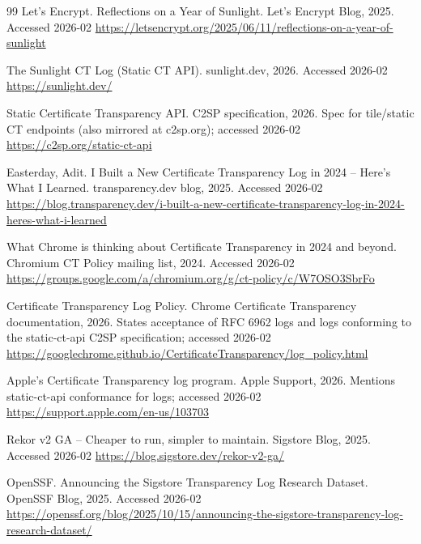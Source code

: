 \documentclass[11pt]{article}
\begin{document}
\begin{thebibliography}{99}
{Let's Encrypt}.
\newblock Reflections on a Year of Sunlight.
\newblock Let's Encrypt Blog, 2025.
\newblock Accessed 2026-02
\newblock \url{https://letsencrypt.org/2025/06/11/reflections-on-a-year-of-sunlight}

\newblock The Sunlight CT Log (Static CT API).
\newblock sunlight.dev, 2026.
\newblock Accessed 2026-02
\newblock \url{https://sunlight.dev/}

\newblock Static Certificate Transparency API.
\newblock C2SP specification, 2026.
\newblock Spec for tile/static CT endpoints (also mirrored at c2sp.org); accessed 2026-02
\newblock \url{https://c2sp.org/static-ct-api}

Easterday, Adit.
\newblock I Built a New Certificate Transparency Log in 2024 -- Here's What I Learned.
\newblock transparency.dev blog, 2025.
\newblock Accessed 2026-02
\newblock \url{https://blog.transparency.dev/i-built-a-new-certificate-transparency-log-in-2024-heres-what-i-learned}

\newblock What Chrome is thinking about Certificate Transparency in 2024 and beyond.
\newblock Chromium CT Policy mailing list, 2024.
\newblock Accessed 2026-02
\newblock \url{https://groups.google.com/a/chromium.org/g/ct-policy/c/W7OSO3SbrFo}

\newblock Certificate Transparency Log Policy.
\newblock Chrome Certificate Transparency documentation, 2026.
\newblock States acceptance of {RFC 6962} logs and logs conforming to the {static-ct-api} {C2SP} specification; accessed 2026-02
\newblock \url{https://googlechrome.github.io/CertificateTransparency/log_policy.html}

\newblock Apple's Certificate Transparency log program.
\newblock Apple Support, 2026.
\newblock Mentions {static-ct-api} conformance for logs; accessed 2026-02
\newblock \url{https://support.apple.com/en-us/103703}

\newblock Rekor v2 GA -- Cheaper to run, simpler to maintain.
\newblock Sigstore Blog, 2025.
\newblock Accessed 2026-02
\newblock \url{https://blog.sigstore.dev/rekor-v2-ga/}

{OpenSSF}.
\newblock Announcing the Sigstore Transparency Log Research Dataset.
\newblock OpenSSF Blog, 2025.
\newblock Accessed 2026-02
\newblock \url{https://openssf.org/blog/2025/10/15/announcing-the-sigstore-transparency-log-research-dataset/}


\end{thebibliography}
\end{document}
